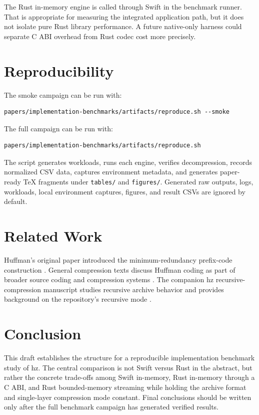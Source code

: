 \documentclass[conference]{IEEEtran}
\begin{document}
The Rust in-memory engine is called through Swift in the benchmark runner. That is appropriate for measuring the integrated application path, but it does not isolate pure Rust library performance. A future native-only harness could separate C ABI overhead from Rust codec cost more precisely.

\section{Reproducibility}

The smoke campaign can be run with:

\begin{verbatim}
papers/implementation-benchmarks/artifacts/reproduce.sh --smoke
\end{verbatim}

The full campaign can be run with:

\begin{verbatim}
papers/implementation-benchmarks/artifacts/reproduce.sh
\end{verbatim}

The script generates workloads, runs each engine, verifies decompression, records normalized CSV data, captures environment metadata, and generates paper-ready TeX fragments under \texttt{tables/} and \texttt{figures/}. Generated raw outputs, logs, workloads, local environment captures, figures, and result CSVs are ignored by default.

\section{Related Work}

Huffman's original paper introduced the minimum-redundancy prefix-code construction \cite{huffman1952method}. General compression texts discuss Huffman coding as part of broader source coding and compression systems \cite{sayood2017introduction}. The companion hz recursive-compression manuscript studies recursive archive behavior and provides background on the repository's recursive mode \cite{hzRecursiveHuffman}.

\section{Conclusion}

This draft establishes the structure for a reproducible implementation benchmark study of hz. The central comparison is not Swift versus Rust in the abstract, but rather the concrete trade-offs among Swift in-memory, Rust in-memory through a C ABI, and Rust bounded-memory streaming while holding the archive format and single-layer compression mode constant. Final conclusions should be written only after the full benchmark campaign has generated verified results.



\end{document}

